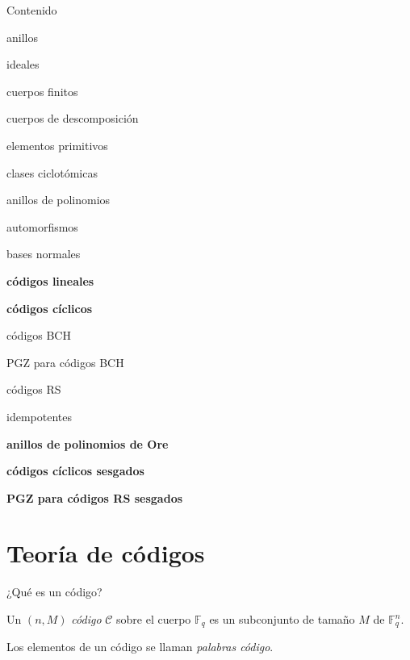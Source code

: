 \documentclass[spanish,aspectratio=169]{beamer}
\begin{document}
\begin{frame}{Contenido}
  \color{foreground!60}
  \begin{description*}[font=\normalfont]
    \item[anillos]
    \item[ideales] 
    \item[cuerpos finitos] 
    \item[cuerpos de descomposición] 
    \item[elementos primitivos] 
    \item[clases ciclotómicas] 
    \item[anillos de polinomios] 
    \item[automorfismos] 
    \item[bases normales] 
    \item[\textbf{\textcolor{foreground}{códigos lineales}}]
    \item[\textbf{\textcolor{foreground}{códigos cíclicos}}]
    \item[códigos BCH]
    \item[PGZ para códigos BCH]
    \item[códigos RS]
    \item[idempotentes] 
    \item[\textbf{\textcolor{foreground}{anillos de polinomios de Ore}}]
    \item[\textbf{\textcolor{foreground}{códigos cíclicos sesgados}}]
    \item[\textbf{\textcolor{foreground}{PGZ para códigos RS sesgados}}]
  \end{description*}
  
\end{frame}

\section{Teoría de códigos}
\begin{frame}{¿Qué es un código?}
  \begin{definition}
    Un \((n, M)\) \emph{código} \(\mathcal C\) sobre el cuerpo \(\mathbb F_q\) es un subconjunto de tamaño \(M\) de \(\mathbb F_q^n\).
  \end{definition}
  
  Los elementos de un código se llaman \emph{palabras código}.
\end{frame}
\end{document}
